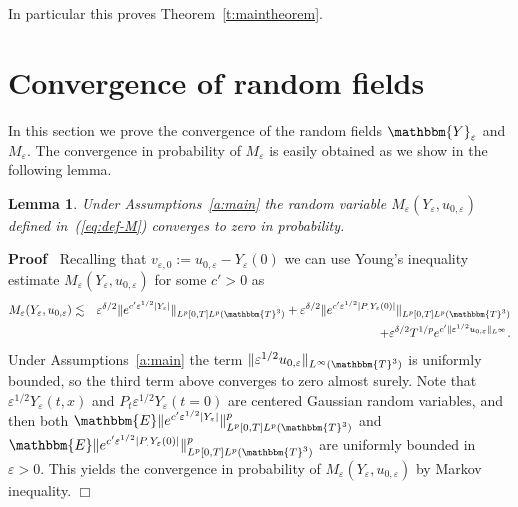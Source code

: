 \documentclass[a4paper,11pt]{article}
\newcommand{\assign}{:=}
\newcommand{\point}{.}
\newenvironment{proof}{\noindent\textbf{Proof\ }}{\hspace*{\fill}$\Box$\medskip}
\newtheorem{lemma}[theorem]{Lemma}
{\theorembodyfont{\rmfamily}\newtheorem{remark}[theorem]{Remark}}
\begin{document}
\begin{remark}
  In particular this proves Theorem~\ref{t:maintheorem}.
\end{remark}

\section{\label{s:comparing}Convergence of random fields}

In this section we prove the convergence of the random fields
$\mathbbm{Y}_{\varepsilon}$ and $M_{\varepsilon}$. The convergence in
probability of $M_{\varepsilon}$ is easily obtained as we show in the
following lemma.

\begin{lemma}
  \label{l:rem-converg}Under Assumptions~\ref{a:main} the random variable
  $M_{\varepsilon} (Y_{\varepsilon}, u_{0, \varepsilon})$ defined
  in~(\ref{eq:def-M}) converges to zero in probability. 
\end{lemma}

\begin{proof}
  Recalling that $v_{\varepsilon, 0} \assign u_{0, \varepsilon} -
  Y_{\varepsilon} (0)$ we can use Young's inequality estimate $M_{\varepsilon}
  (Y_{\varepsilon}, u_{0, \varepsilon})$ for some $c' > 0$ as
  \begin{eqnarray*}
    M_{\varepsilon} (Y_{\varepsilon}, u_{0, \varepsilon}) & \lesssim &
    \varepsilon^{\delta / 2} \|e^{c' \varepsilon^{1 / 2}  | Y_{\varepsilon} |}
    \|_{L^p [0, T] L^p (\mathbbm{T}^3)} + \varepsilon^{\delta / 2} \|e^{c'
    \varepsilon^{1 / 2}  | P_{\point} Y_{\varepsilon} (0) |} \|_{L^p [0, T]
    L^p (\mathbbm{T}^3)}\\
    &  & + \varepsilon^{\delta / 2} T^{1 / p} e^{c'  \| \varepsilon^{1 / 2}
    u_{0, \varepsilon} \|_{L^{\infty}}} .
  \end{eqnarray*}
  Under Assumptions~\ref{a:main} the term $\| \varepsilon^{1 / 2} u_{0,
  \varepsilon} \|_{L^{\infty} (\mathbbm{T}^3)}$ is uniformly bounded, so the
  third term above converges to zero almost surely. Note that $\varepsilon^{1
  / 2} Y_{\varepsilon} (t, x)$ and $P_t \varepsilon^{1 / 2} Y_{\varepsilon} (t
  = 0)$ are centered Gaussian random variables, and then both $\mathbbm{E}
  \|e^{c' \varepsilon^{1 / 2}  | Y_{\varepsilon} |} \|^p_{L^p [0, T] L^p
  (\mathbbm{T}^3)}$ and $\mathbbm{E} \|e^{c' \varepsilon^{1 / 2}  | P_{\point}
  Y_{\varepsilon} (0) |} \|^p_{L^p [0, T] L^p (\mathbbm{T}^3)}$ are uniformly
  bounded in $\varepsilon > 0$. This yields the convergence in probability of
  $M_{\varepsilon} (Y_{\varepsilon}, u_{0, \varepsilon})$ by Markov
  inequality.
\end{proof}
\end{document}
